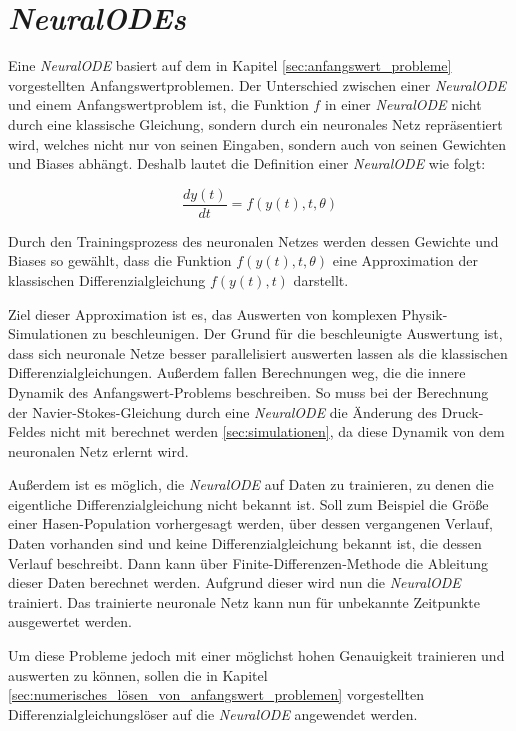 
\section{\textit{NeuralODEs}} \label{sec:neural_ode}

Eine \textit{NeuralODE} \cite{neuralode} basiert auf dem in Kapitel \ref{sec:anfangswert_probleme} vorgestellten Anfangswertproblemen.
Der Unterschied zwischen einer \textit{NeuralODE} und einem Anfangswertproblem ist, 
die Funktion $f$ in einer \textit{NeuralODE} nicht durch eine klassische Gleichung, sondern durch ein 
neuronales Netz repräsentiert wird, welches nicht nur von seinen 
Eingaben, sondern auch von seinen Gewichten und Biases abhängt.
Deshalb lautet die Definition einer \textit{NeuralODE} wie folgt:

$$
\frac{d y(t)}{dt} = f(y(t), t, \theta)
$$

Durch den Trainingsprozess des neuronalen Netzes werden dessen Gewichte und Biases 
so gewählt, dass die Funktion $f(y(t), t, \theta)$ eine Approximation der klassischen 
Differenzialgleichung $f(y(t), t)$ darstellt.

Ziel dieser Approximation ist es, das Auswerten von komplexen Physik-Simulationen zu beschleunigen.
Der Grund für die beschleunigte Auswertung ist, dass sich neuronale Netze besser parallelisiert auswerten lassen
als die klassischen Differenzialgleichungen.
Außerdem fallen Berechnungen weg, die die innere Dynamik des Anfangswert-Problems beschreiben.
So muss bei der Berechnung der Navier-Stokes-Gleichung durch eine \textit{NeuralODE} die Änderung des Druck-Feldes 
nicht mit berechnet werden \ref{sec:simulationen}, da diese Dynamik von dem neuronalen Netz erlernt wird.

Außerdem ist es möglich, die \textit{NeuralODE} auf Daten zu trainieren, 
zu denen die eigentliche Differenzialgleichung nicht bekannt ist.
Soll zum Beispiel die Größe einer Hasen-Population vorhergesagt werden, über dessen vergangenen Verlauf, Daten vorhanden sind und keine 
Differenzialgleichung bekannt ist, die dessen Verlauf beschreibt.
Dann kann über Finite-Differenzen-Methode die Ableitung dieser Daten berechnet werden.
Aufgrund dieser wird nun die \textit{NeuralODE} trainiert.
Das trainierte neuronale Netz kann nun für unbekannte Zeitpunkte ausgewertet werden.

Um diese Probleme jedoch mit einer möglichst hohen Genauigkeit trainieren und auswerten zu können,
sollen die in Kapitel \ref{sec:numerisches_lösen_von_anfangswert_problemen} vorgestellten Differenzialgleichungslöser auf die \textit{NeuralODE} angewendet werden.







